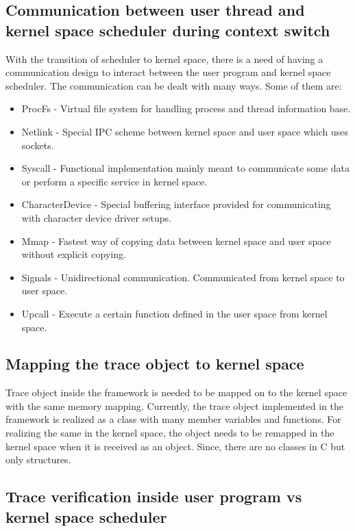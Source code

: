 \subsection{Communication between user thread and kernel space scheduler during context switch} 

With the transition of scheduler to kernel space, there is a need of having a communication design to interact between the user program and kernel space scheduler. 
The communication can be dealt with many ways. 
Some of them are:

\begin{itemize}
\item ProcFs - Virtual file system for handling process and thread information base.
\item Netlink - Special IPC scheme between kernel space and user space which uses sockets.
\item Syscall - Functional implementation mainly meant to communicate some data or perform a specific service in kernel space. 
\item CharacterDevice - Special buffering interface provided for communicating with character device driver setups.
\item Mmap - Fastest way of copying data between kernel space and user space without explicit copying.
\item Signals - Unidirectional communication. Communicated from kernel space to user space. 
\item Upcall - Execute a certain function defined in the user space from kernel space.

\end{itemize}

\subsection{Mapping the trace object to kernel space}

Trace object inside the framework is needed to be mapped on to the kernel space with the same memory mapping. 
Currently, the trace object implemented in the framework is realized as a class with many member variables and functions. 
For realizing the same in the kernel space, the object needs to be remapped in the kernel space when it is received as an object. 
Since, there are no classes in C but only structures.

\subsection{Trace verification inside user program vs kernel space scheduler}

